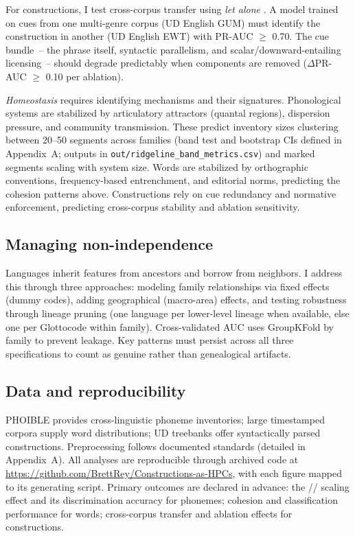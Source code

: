 \documentclass[12pt]{article}
\begin{document}
For constructions, I test cross-corpus transfer using \textit{let alone} \citep{FillmoreKayOConnor1988}. A model trained on cues from one multi-genre corpus (UD English GUM) must identify the construction in another (UD English EWT) with PR-AUC $\geq$ 0.70. The cue bundle~-- the phrase itself, syntactic parallelism, and scalar/downward-entailing licensing~-- should degrade predictably when components are removed ($\Delta$PR-AUC $\geq$ 0.10 per ablation).

\textit{Homeostasis} requires identifying mechanisms and their signatures. Phonological systems are stabilized by articulatory attractors (quantal regions), dispersion pressure, and community transmission. These predict inventory sizes clustering between 20--50 segments across families (band test and bootstrap CIs defined in Appendix~A; outputs in \texttt{out/ridgeline\_band\_metrics.csv}) and marked segments scaling with system size. Words are stabilized by orthographic conventions, frequency-based entrenchment, and editorial norms, predicting the cohesion patterns above. Constructions rely on cue redundancy and normative enforcement, predicting cross-corpus stability and ablation sensitivity.

\subsection{Managing non-independence}

Languages inherit features from ancestors and borrow from neighbors. I address this through three approaches: modeling family relationships via fixed effects (dummy codes), adding geographical (macro-area) effects, and testing robustness through lineage pruning (one language per lower-level lineage when available, else one per Glottocode within family). Cross-validated AUC uses GroupKFold by family to prevent leakage. Key patterns must persist across all three specifications to count as genuine rather than genealogical artifacts.

\subsection{Data and reproducibility}

PHOIBLE provides cross-linguistic phoneme inventories; large timestamped corpora supply word distributions; UD treebanks offer syntactically parsed constructions. Preprocessing follows documented standards (detailed in Appendix~A). All analyses are reproducible through archived code at \url{https://github.com/BrettRey/Constructions-as-HPCs}, with each figure mapped to its generating script. Primary outcomes are declared in advance: the // scaling effect and its discrimination accuracy for phonemes; cohesion and classification performance for words; cross-corpus transfer and ablation effects for constructions.
\end{document}
